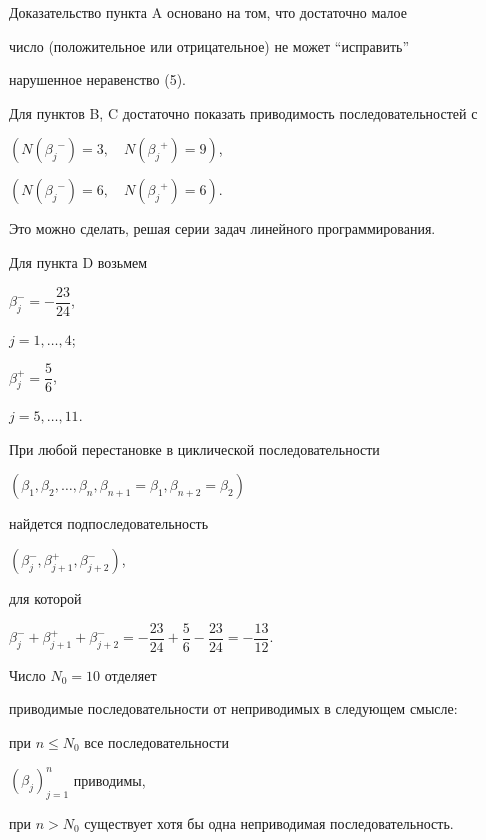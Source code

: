 Доказательство пункта A основано на том, что достаточно малое


число (положительное или отрицательное) не может ``исправить''


нарушенное неравенство (5).





Для пунктов B, C достаточно показать приводимость последовательностей с


$(N({\beta _{j} }^{-})=3,\quad N({\beta _{j} }^{+} )=9)$,


$(N({\beta _{j} }^{-} )= 6,\quad N({\beta _{j} }^{+} )= 6)$.


Это можно сделать, решая серии задач линейного программирования.





\begin{exam} Для пункта D возьмем


$\beta _{j}^{-}=-\dfrac{23}{24}$,


$j=1,\dotsc,4$;


$\beta _{j}^{+}=\dfrac{5}{6}$,


$j=5,\dotsc,11$.


При любой перестановке в циклической последовательности


$(\beta_{1},\beta_{2},\dotsc,\beta_{n},


\beta_{n+1}=\beta_{1},\beta_{n+2}=\beta_{2})$


найдется подпоследовательность


$(\beta _{j}^{-},\beta_{j+1}^{+},\beta_{j+2}^{-})$,


для которой


$\beta _{j}^{-}+\beta_{j+1}^{+}+\beta_{j+2}^{-}


=-\dfrac{23}{24}+\dfrac{5}{6}-\dfrac{23}{24}=-\dfrac{13}{12}$.


\end{exam}





\begin{thm} Число $N_{0} =10$ отделяет


приводимые последовательности от неприводимых в следующем смысле:


при $n\le N_{0}$ все последовательности


$(\beta _{j})_{j=1}^{n}$ приводимы,


при $n>N_{0}$ существует хотя бы одна неприводимая последовательность.


\end{thm}





